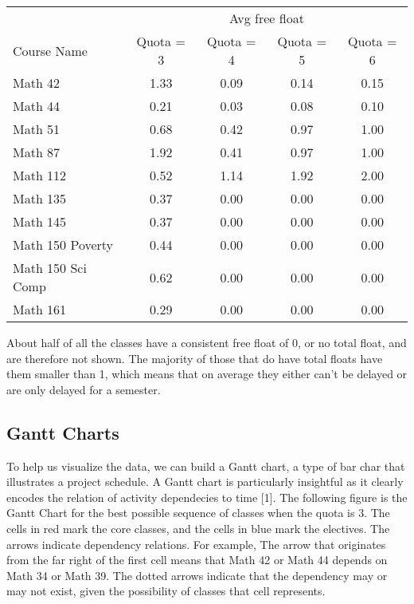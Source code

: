 \documentclass[12pt, oneside]{article}
\begin{document}
\begin{center}
    \begin{tabular}{|l | c | c | c | c |}
    \toprule
    & \multicolumn{4}{|c|}{Avg free float}   \\
    Course Name         & Quota = 3 & Quota = 4 & Quota = 5 & Quota = 6 \\ 
    \midrule
    Math 42              & 1.33 & 0.09 & 0.14 & 0.15 \\
    Math 44              & 0.21 & 0.03 & 0.08 & 0.10 \\
    Math 51              & 0.68 & 0.42 & 0.97 & 1.00\\
    Math 87              & 1.92 & 0.41 & 0.97 & 1.00\\
    Math 112             & 0.52 & 1.14 & 1.92 & 2.00\\
    Math 135             & 0.37 & 0.00 & 0.00 & 0.00 \\ 
    Math 145             & 0.37 & 0.00 & 0.00& 0.00 \\ 
    Math 150 Poverty     & 0.44 & 0.00 & 0.00& 0.00 \\ 
    Math 150 Sci Comp    & 0.62 & 0.00 & 0.00& 0.00 \\ 
    Math 161             & 0.29 & 0.00 & 0.00& 0.00 \\ 
    \bottomrule
    \end{tabular}
\end{center}

\bigskip


About half of all the classes have a consistent free float of 0, or no total float, and are therefore not shown. The majority of those that do have total floats have them smaller than 1, which means that on average they either can't be delayed or are only delayed for a semester. 

\subsection{Gantt Charts}
To help us visualize the data, we can build a Gantt chart, a type of bar char that illustrates a project schedule. A Gantt chart is particularly insightful as it clearly encodes the relation of activity dependecies to time [1].
The following figure is the Gantt Chart for the best possible sequence of classes when the quota is 3. The cells in red mark the core classes, and the cells in blue mark the electives. The arrows indicate dependency relations. For example, The arrow that originates from the far right of the first cell means that Math 42 or Math 44 depends on Math 34 or Math 39. The dotted arrows indicate that the dependency may or may not exist, given the possibility of classes that cell represents.
\end{document}
